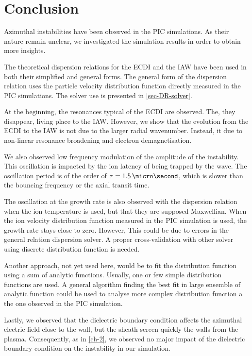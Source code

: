 
\section{Conclusion}
  Azimuthal instabilities have been observed in the \ac{PIC} simulations.
  As their nature remain unclear, we investigated the simulation results in order to obtain more insights.
  
  The theoretical dispersion relations for the \ac{ECDI} and the \ac{IAW} have been used in both their simplified and general forms.
  The general form of the dispersion relation uses the particle velocity distribution function directly measured in the \ac{PIC} simulations.
  The solver use is presented in \cref{sec-DR-solver}.
  
  At the beginning, the resonances typical of the \ac{ECDI} are observed.
  The, they disappear, living place to the \ac{IAW}.
  However, we show that the evolution from the \ac{ECDI} to the \ac{IAW}  is not due to the larger radial wavenumber.
  Instead, it due to non-linear resonance broadening and electron demagnetisation.
  
  \vspace{1ex}
  We also observed low frequency modulation of the amplitude of the instability.
  This oscillation is impacted by the ion latency of being trapped by the wave.
  The oscillation period is of the order of $\tau=1.5\,\micro\second$, which is slower than the bouncing frequency or the axial transit time.
  
  The oscillation at the growth rate is also observed with the dispersion relation when the ion temperature is used, but that they are supposed Maxwellian.
  When the ion velocity distribution function measured in the \ac{PIC}  simulation is used, the growth rate stays close to zero.
  However, This could be due to errors in the general relation dispersion solver.
  A proper cross-validation with other solver using discrete distribution function is needed.
  
  Another approach, not yet used here, would be to fit the distribution function using a sum of analytic functions.
  Usually, one or few simple distribution functions are used.
  A general algorithm finding the best fit in large ensemble of analytic function could be used to analyse more complex distribution function a the one observed in the PIC simulation.
  
  \vspace{1ex}
  Lastly, we observed that the dielectric boundary condition affects the azimuthal electric field close to the wall, but the sheath screen quickly the walls from the plasma.
  Consequently, as in \cref{ch-2}, we observed no major impact of the dielectric boundary condition on the instability in our simulation.
  
